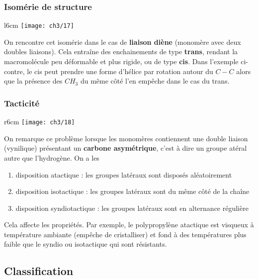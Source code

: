 		\subsubsection{Isomérie de structure}
		\begin{wrapfigure}[7]{l}{6cm}
		\vspace{-5mm}
		\texttt{[image: ch3/17]}
		\end{wrapfigure}	
		On rencontre cet isomérie dans le cas de \textbf{liaison diène} (monomère avec deux doubles liaisons). Cela entraîne des enchainements de type \textbf{trans}, rendant la macromolécule peu déformable et plus rigide, ou de type \textbf{cis}. Dans l'exemple ci-contre, le cis peut prendre une forme d'hélice par rotation autour du $C-C$ alors que la présence des $CH_3$ du même côté l'en empêche dans le cas du trans.
		
		\subsubsection{Tacticité}
		\begin{wrapfigure}[7]{r}{6cm}
			\vspace{-5mm}
			\texttt{[image: ch3/18]}
			\end{wrapfigure}	
			On remarque ce problème lorsque les monomères contiennent une double liaison (vynilique) présentant un \textbf{carbone asymétrique}, c'est à dire un groupe atéral autre que l'hydrogène.  On a les
			\begin{enumerate}
				\item disposition atactique : les groupes latéraux sont disposés aléatoirement
				\item disposition isotactique : les groupes latéraux sont du même côté de la chaîne
				\item disposition syndiotactique : les groupes latéraux sont en alternance régulière
			\end{enumerate}
			Cela affecte les propriétés. Par exemple, le polypropylène atactique est visqueux à température ambiante (empêche de cristalliser) et fond à des températures plus faible que le syndio ou isotactique qui sont résistants. 
		
	\subsection{Classification}
